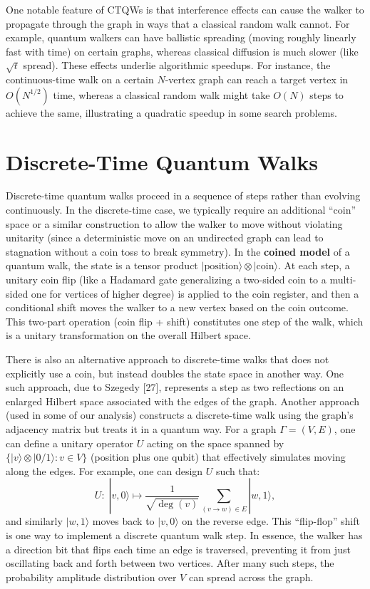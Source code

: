 \documentclass[11pt]{article}
\theoremstyle{definition}
\begin{document}
One notable feature of CTQWs is that interference effects can cause the walker to propagate through the graph in ways that a classical random walk cannot. For example, quantum walkers can have ballistic spreading (moving roughly linearly fast with time) on certain graphs, whereas classical diffusion is much slower (like $\sqrt{t}$ spread). These effects underlie algorithmic speedups. For instance, the continuous-time walk on a certain $N$-vertex graph can reach a target vertex in $O(N^{1/2})$ time, whereas a classical random walk might take $O(N)$ steps to achieve the same, illustrating a quadratic speedup in some search problems.

\section{Discrete-Time Quantum Walks}
Discrete-time quantum walks proceed in a sequence of steps rather than evolving continuously. In the discrete-time case, we typically require an additional “coin” space or a similar construction to allow the walker to move without violating unitarity (since a deterministic move on an undirected graph can lead to stagnation without a coin toss to break symmetry). In the \textbf{coined model} of a quantum walk, the state is a tensor product $|\text{position}\rangle \otimes |\text{coin}\rangle$. At each step, a unitary coin flip (like a Hadamard gate generalizing a two-sided coin to a multi-sided one for vertices of higher degree) is applied to the coin register, and then a conditional shift moves the walker to a new vertex based on the coin outcome. This two-part operation (coin flip + shift) constitutes one step of the walk, which is a unitary transformation on the overall Hilbert space.

There is also an alternative approach to discrete-time walks that does not explicitly use a coin, but instead doubles the state space in another way. One such approach, due to Szegedy [27], represents a step as two reflections on an enlarged Hilbert space associated with the edges of the graph. Another approach (used in some of our analysis) constructs a discrete-time walk using the graph’s adjacency matrix but treats it in a quantum way. For a graph $\Gamma=(V,E)$, one can define a unitary operator $U$ acting on the space spanned by $\{|v\rangle \otimes |0/1\rangle: v \in V\}$ (position plus one qubit) that effectively simulates moving along the edges. For example, one can design $U$ such that:
\[ U:\; |v,0\rangle \mapsto \frac{1}{\sqrt{\deg(v)}}\sum_{(v\to w)\in E} |w,1\rangle, \] 
and similarly $|w,1\rangle$ moves back to $|v,0\rangle$ on the reverse edge. This “flip-flop” shift is one way to implement a discrete quantum walk step. In essence, the walker has a direction bit that flips each time an edge is traversed, preventing it from just oscillating back and forth between two vertices. After many such steps, the probability amplitude distribution over $V$ can spread across the graph.
\end{document}
